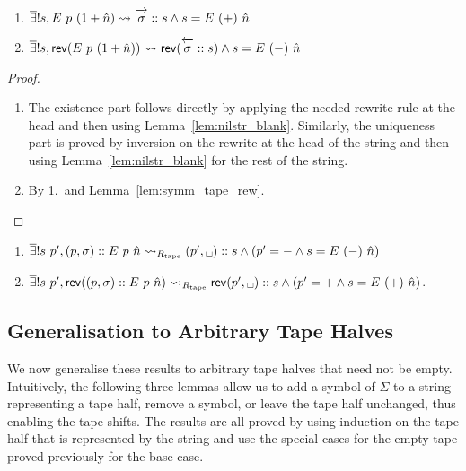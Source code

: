 \begin{lemma}\label{lem:nilstr_add}\leavevmode
  \begin{enumerate}
    \item $\mexists s, \nilstr{p}{(\natS{\hat{n}})} \strent{} \polpos{\sigma} :: s \land s = \nilstr{(+)}{\hat{n}}$
    \item $\mexists s, \rev{(\nilstr{p}{(\natS{\hat{n}})})} \strent{} \rev{(\polneg{\sigma} :: s)} \land s = \nilstr{(-)}{\hat{n}}$
  \end{enumerate}
\end{lemma}
\begin{proof}
  \begin{enumerate}
    \item The existence part follows directly by applying the needed rewrite rule at the head and then using Lemma~\ref{lem:nilstr_blank}. Similarly, the uniqueness part is proved by inversion on the rewrite at the head of the string and then using Lemma~\ref{lem:nilstr_blank} for the rest of the string.
    \item By 1.\ and Lemma~\ref{lem:symm_tape_rew}. 
  \end{enumerate}
\end{proof}

\begin{lemma}\label{lem:nilstr_rem}\leavevmode
  \begin{enumerate}
    \item $\mexists s~p', (p, \sigma) :: \nilstr{p}{\hat{n}} \strent{\Rtape} (p', \blank) :: s \land (p' = - \land s = \nilstr{(-)}{\hat{n}})$
    \item $\mexists s~p', \rev{((p, \sigma) :: \nilstr{p}{\hat{n}})} \strent{\Rtape} \rev{(p', \blank):: s} \land (p' = + \land s = \nilstr{(+)}{\hat{n}})$. 
  \end{enumerate}
\end{lemma}

\subsection{Generalisation to Arbitrary Tape Halves}

We now generalise these results to arbitrary tape halves that need not be empty. 
Intuitively, the following three lemmas allow us to add a symbol of $\Sigma$ to a string representing a tape half, remove a symbol, or leave the tape half unchanged, thus enabling the tape shifts.
The results are all proved by using induction on the tape half that is represented by the string and use the special cases for the empty tape proved previously for the base case.

